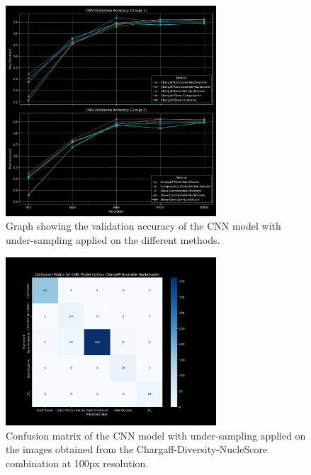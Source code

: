 \begin{appendices}
	\begin{figure}[htbp!]
		\centering
		\includegraphics[width=0.7\textwidth]{../imgs/graphs/kfold-undersample/cnn_validation_accuracy_groups_mask_5_kfold_undersample.png}
		\caption{Graph showing the validation accuracy of the CNN model with under-sampling applied on the different methods.}
		\label{fig:under_sampling_accuracy}
	\end{figure}

	\begin{figure}[htbp!]
		\centering
		\includegraphics[width=0.7\textwidth]{../imgs/graphs/kfold-undersample/cnn_confusion_matrix_100px_mask_5-kfold_undersample.png}
		\caption{Confusion matrix of the CNN model with under-sampling applied on the images obtained from the Chargaff-Diversity-NucleScore
			combination at 100px resolution.}
		\label{fig:under_sampling_confusion_matrix}
	\end{figure}


\end{appendices}

